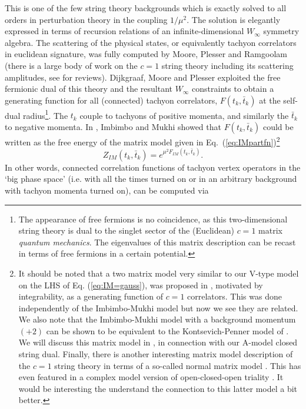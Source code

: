 \documentclass[english]{article}
\begin{document}
This is one of the few string theory backgrounds which is exactly solved to all orders in perturbation theory in the coupling $1/\mu^2$. The solution is elegantly expressed in terms of recursion relations of an infinite-dimensional $W_{\infty}$ symmetry algebra. 
The scattering of the physical states, or equivalently tachyon correlators in euclidean signature, was fully computed by Moore, Plesser and Ramgoolam \cite{mooreRangPlessScattering, mandal1991interactions} (there is a large body of work on the $c=1$ string theory including its scattering amplitudes, see \cite{ginsparg1993lectures, klebanov1991string} for reviews). 
Dijkgraaf, Moore and Plesser \cite{Dijkgraaf:1991qh}
exploited the free fermionic dual of this theory and the resultant $W_{\infty}$ constraints to obtain a generating function for all (connected) tachyon correlators, $F(t_k,\bar{t}_k)$ at the self-dual radius\footnote{The appearance of free fermions is no coincidence, as this two-dimensional string theory is dual to the singlet sector of the (Euclidean) $c=1$ matrix \textit{quantum mechanics}. The eigenvalues of this matrix description can be recast in terms of free fermions in a certain potential.}. The $t_k$ couple to tachyons of positive momenta, and similarly the $\bar{t}_k$ to negative momenta. In \cite{ImbimboMukhi}, Imbimbo and Mukhi showed that $F(t_k,\bar{t}_k)$ could be written as the free energy of the matrix model given in Eq.~(\ref{eq:IMpartfn})\footnote{It should be noted that a two matrix model very similar to our V-type model on the LHS of Eq. (\ref{eq:IM=gauss}), was proposed in \cite{BonoraXiong2matrix}, motivated by integrability, as a generating function of $c=1$ correlators. This was done independently of the Imbimbo-Mukhi model but now we see they are related. We also note that the Imbimbo-Mukhi model with a background momentum $(+2)$ can be shown to be equivalent to the Kontsevich-Penner model of \cite{ChekhovMakeenkoKP}. We will discuss this matrix model in \cite{DSDIII}, in connection with our A-model closed string dual. Finally, there is another interesting matrix model description of the $c=1$ string theory in terms of a so-called normal matrix model \cite{AlexandrovNormal}. This has even featured in a complex model version of open-closed-open triality \cite{brown2011complex}. It would be interesting the understand the connection to this latter model a bit better.}
\begin{equation}
    Z_{IM}(t_k,\bar{t}_k) = e^{\mu^2 F_{IM}(t_k,\bar{t}_k)}.
\end{equation}
In other words, connected correlation functions of tachyon vertex operators in the `big phase space' (i.e. with all the times turned on or in an arbitrary background with tachyon momenta turned on), can be computed via 
\end{document}
